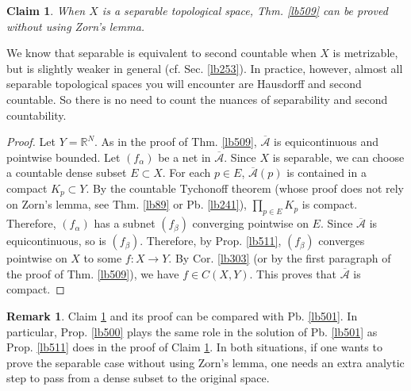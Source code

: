\documentclass[12pt,b5paper,notitlepage]{article}
\theoremstyle{definition}
\newtheorem{rem}[df]{Remark}
\theoremstyle{plain}
\newtheorem{claim}[df]{Claim}
\newcommand{\ovl}{\overline}
\newcommand{\scr}{\mathscr}
\newcommand{\Rbb}{\mathbb R}
\numberwithin{equation}{section}
\begin{document}
\begin{claim}\label{lb510}
When $X$ is a separable topological space, Thm. \ref{lb509} can be proved without using Zorn's lemma.
\end{claim}

We know that separable is equivalent to second countable when $X$ is metrizable, but is slightly weaker in general (cf. Sec. \ref{lb253}). In practice, however, almost all separable topological spaces you will encounter are Hausdorff and second countable. So there is no need to count the nuances of separability and second countability.

\begin{proof}
Let $Y=\Rbb^N$. As in the proof of Thm. \ref{lb509}, $\ovl{\scr A}$ is equicontinuous and pointwise bounded. Let $(f_\alpha)$ be a net in $\ovl{\scr A}$. Since $X$ is separable, we can choose a countable dense subset $E\subset X$. For each $p\in E$, $\ovl{\scr A}(p)$ is contained in a compact $K_p\subset Y$. By the countable Tychonoff theorem (whose proof does not rely on Zorn's lemma, see Thm. \ref{lb89} or Pb. \ref{lb241}), $\prod_{p\in E}K_p$ is compact. Therefore, $(f_\alpha)$ has a subnet $(f_\beta)$ converging pointwise on $E$. Since $\ovl{\scr A}$ is equicontinuous, so is $(f_\beta)$. Therefore, by Prop. \ref{lb511}, $(f_\beta)$ converges pointwise on $X$ to some $f:X\rightarrow Y$. By Cor. \ref{lb303} (or by the first paragraph of the proof of Thm. \ref{lb509}), we have $f\in C(X,Y)$. This proves that $\ovl{\scr A}$ is compact.
\end{proof}

\begin{rem}
Claim \ref{lb510} and its proof can be compared with Pb. \ref{lb501}. In particular,  Prop. \ref{lb500} plays the same role in the solution of Pb. \ref{lb501} as Prop. \ref{lb511} does in the proof of Claim \ref{lb510}. In both situations, if one wants to prove the separable case without using Zorn's lemma, one needs an extra analytic step to pass from a dense subset to the original space. 
\end{rem}
\end{document}
